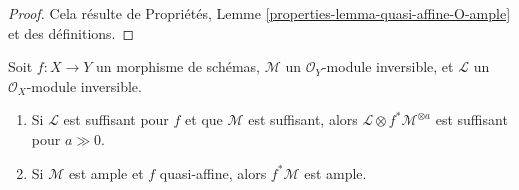 \begin{proof}
Cela résulte de Propriétés, Lemme \ref{properties-lemma-quasi-affine-O-ample} et des
définitions.
\end{proof}

\begin{lemma}
\label{lemma-pullback-ample-tensor-relatively-ample}
Soit $f : X \to Y$ un morphisme de schémas, $\mathcal{M}$
un $\mathcal{O}_Y$-module inversible, et $\mathcal{L}$ un
$\mathcal{O}_X$-module inversible.
\begin{enumerate}
\item Si $\mathcal{L}$ est suffisant pour $f$
et que $\mathcal{M}$ est suffisant, alors $\mathcal{L} \otimes f^*\mathcal{M}^{\otimes a}$ est suffisant pour
$a \gg 0$.
\item Si $\mathcal{M}$ est ample et
$f$ quasi-affine, alors $f^*\mathcal{M}$ est ample.
\end{enumerate}
\end{lemma}

